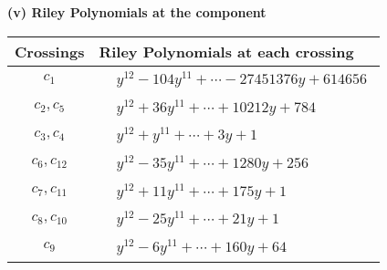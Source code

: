 \documentclass[1p]{elsarticle_modified}
\theoremstyle{definition}
\begin{document}
\newpage\renewcommand{\arraystretch}{1}
\flushleft \textbf{(v) Riley Polynomials at the component}\newline \\
\begin{tabular}{m{50pt}|m{274pt}}
Crossings & \hspace{64pt}Riley Polynomials at each crossing \\
\hline $$\begin{aligned}c_{1}\end{aligned}$$&$\begin{aligned}
&y^{12}-104 y^{11}+\cdots-27451376 y+614656
\end{aligned}$\\
\hline $$\begin{aligned}c_{2},c_{5}\end{aligned}$$&$\begin{aligned}
&y^{12}+36 y^{11}+\cdots+10212 y+784
\end{aligned}$\\
\hline $$\begin{aligned}c_{3},c_{4}\end{aligned}$$&$\begin{aligned}
&y^{12}+y^{11}+\cdots+3 y+1
\end{aligned}$\\
\hline $$\begin{aligned}c_{6},c_{12}\end{aligned}$$&$\begin{aligned}
&y^{12}-35 y^{11}+\cdots+1280 y+256
\end{aligned}$\\
\hline $$\begin{aligned}c_{7},c_{11}\end{aligned}$$&$\begin{aligned}
&y^{12}+11 y^{11}+\cdots+175 y+1
\end{aligned}$\\
\hline $$\begin{aligned}c_{8},c_{10}\end{aligned}$$&$\begin{aligned}
&y^{12}-25 y^{11}+\cdots+21 y+1
\end{aligned}$\\
\hline $$\begin{aligned}c_{9}\end{aligned}$$&$\begin{aligned}
&y^{12}-6 y^{11}+\cdots+160 y+64
\end{aligned}$\\
\hline
\end{tabular}\\~\\
\end{document}
